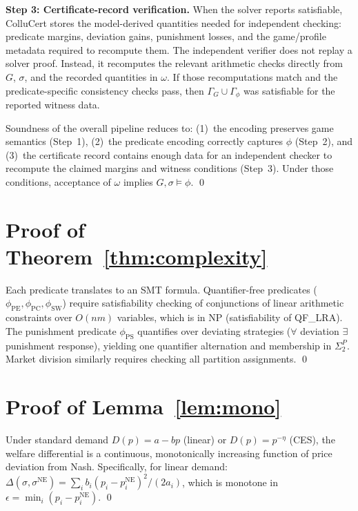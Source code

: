 \documentclass[11pt]{article}
\begin{document}
\medskip\noindent\textbf{Step 3: Certificate-record verification.}
When the solver reports satisfiable, ColluCert stores the model-derived quantities needed for independent checking: predicate margins, deviation gains, punishment losses, and the game/profile metadata required to recompute them.  The independent verifier does not replay a solver proof.  Instead, it recomputes the relevant arithmetic checks directly from $G$, $\sigma$, and the recorded quantities in $\omega$.  If those recomputations match and the predicate-specific consistency checks pass, then $\Gamma_G \cup \Gamma_\phi$ was satisfiable for the reported witness data.

Soundness of the overall pipeline reduces to: (1)~the encoding preserves game semantics (Step~1), (2)~the predicate encoding correctly captures $\phi$ (Step~2), and (3)~the certificate record contains enough data for an independent checker to recompute the claimed margins and witness conditions (Step~3).  Under those conditions, acceptance of $\omega$ implies $G, \sigma \models \phi$. \qed

\section{Proof of Theorem~\ref{thm:complexity}}
Each predicate translates to an SMT formula. Quantifier-free predicates ($\phi_{\text{PE}}, \phi_{\text{PC}}, \phi_{\text{SW}}$) require satisfiability checking of conjunctions of linear arithmetic constraints over $O(nm)$ variables, which is in NP (satisfiability of QF\_LRA). The punishment predicate $\phi_{\text{PS}}$ quantifies over deviating strategies ($\forall$ deviation $\exists$ punishment response), yielding one quantifier alternation and membership in $\Sigma_2^P$. Market division similarly requires checking all partition assignments. \qed

\section{Proof of Lemma~\ref{lem:mono}}
Under standard demand $D(p) = a - bp$ (linear) or $D(p) = p^{-\eta}$ (CES), the welfare differential is a continuous, monotonically increasing function of price deviation from Nash. Specifically, for linear demand: $\Delta(\sigma, \sigma^{\text{NE}}) = \sum_i b_i (p_i - p_i^{\text{NE}})^2 / (2a_i)$, which is monotone in $\epsilon = \min_i (p_i - p_i^{\text{NE}})$. \qed
\end{document}

